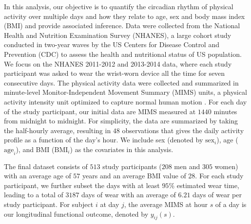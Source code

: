 \documentclass[submit]{smj}
\begin{document}
In this analysis, our objective is to quantify the circadian rhythm of physical activity over multiple days and how they relate to age, sex and body mass index (BMI) and provide associated inference. Data were collected from the National Health and Nutrition Examination Survey (NHANES), a large cohort study conducted in two-year waves by the US Centers for Disease Control and Prevention (CDC) to assess the health and nutritional status of US population. We focus on the NHANES 2011-2012 and 2013-2014 data, where each study participant was asked to wear the wrist-worn device all the time for seven consecutive days. The physical activity data were collected and summarized in minute-level Monitor-Independent Movement Summary (MIMS) units, a physical activity intensity unit optimized to capture normal human motion \citep{John2019}. For each day of the study participant, our initial data are MIMS measured at $1440$ minutes from midnight to midnight. For simplicity, the data are summarized by taking the half-hourly average, resulting in $48$ observations that gives the daily activity profile as a function of the day's hour. We include sex (denoted by $\text{sex}_i$), age ($\text{age}_i$), and BMI ($\text{BMI}_{i}$) as the covariates in this analysis.



The final dataset consists of $513$ study participants ($208$ men and $305$ women) with an average age of $57$ years and an average BMI value of 28. For each study participant, we further subset the days with at least $95\%$ estimated wear time, leading to a total of $3187$ days of wear with an average of $6.21$ days of wear per study participant. For subject $i$ at day $j$, the average MIMS at hour $s$ of a day is our longitudinal functional outcome, denoted by $y_{ij}(s)$. 
\end{document}
